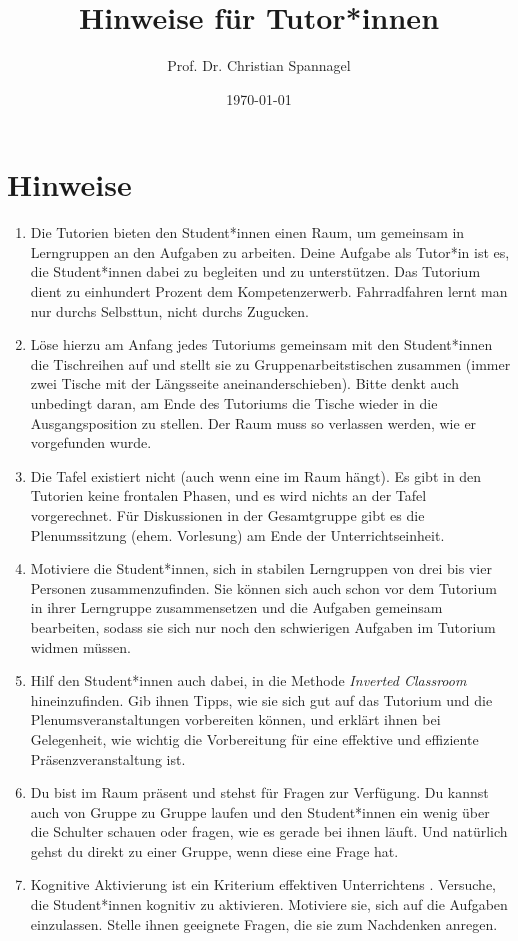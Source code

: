 \documentclass{../cssheet}
\title{Hinweise für Tutor*innen}
\author{Prof. Dr. Christian Spannagel}
\date{\today}
\begin{document}
\printtitle

\section* {Hinweise}
\begin{enumerate}
\item Die Tutorien bieten den Student*innen einen Raum, um gemeinsam in Lerngruppen an den Aufgaben zu arbeiten. Deine Aufgabe als Tutor*in ist es, die Student*innen dabei zu begleiten und zu unterstützen. Das Tutorium dient zu einhundert Prozent dem Kompetenzerwerb. Fahrradfahren lernt man nur durchs Selbsttun, nicht durchs Zugucken.
\item Löse hierzu am Anfang jedes Tutoriums gemeinsam mit den Student*innen die Tischreihen auf und stellt sie zu Gruppenarbeitstischen zusammen (immer zwei Tische mit der Längsseite aneinanderschieben). Bitte denkt auch unbedingt daran, am Ende des Tutoriums die Tische wieder in die Ausgangsposition zu stellen. Der Raum muss so verlassen werden, wie er vorgefunden wurde.
\item Die Tafel existiert nicht (auch wenn eine im Raum hängt). Es gibt in den Tutorien keine frontalen Phasen, und es wird nichts an der Tafel vorgerechnet. Für Diskussionen in der Gesamtgruppe gibt es die Plenumssitzung (ehem. Vorlesung) am Ende der Unterrichtseinheit.
\item Motiviere die Student*innen, sich in stabilen Lerngruppen von drei bis vier Personen zusammenzufinden. Sie können sich auch schon vor dem Tutorium in ihrer Lerngruppe zusammensetzen und die Aufgaben gemeinsam bearbeiten, sodass sie sich nur noch den schwierigen Aufgaben im Tutorium widmen müssen.
\item Hilf den Student*innen auch dabei, in die Methode \emph{Inverted Classroom} hineinzufinden. Gib ihnen Tipps, wie sie sich gut auf das Tutorium und die Plenumsveranstaltungen vorbereiten können, und erklärt ihnen bei Gelegenheit, wie wichtig die Vorbereitung für eine effektive und effiziente Präsenzveranstaltung ist.
\item Du bist im Raum präsent und stehst für Fragen zur Verfügung. Du kannst auch von Gruppe zu Gruppe laufen und den Student*innen ein wenig über die Schulter schauen oder fragen, wie es gerade bei ihnen läuft.  Und natürlich gehst du direkt zu einer Gruppe, wenn diese eine Frage hat.
\item Kognitive Aktivierung ist ein Kriterium effektiven Unterrichtens \parencite{praetorius2018}. Versuche, die Student*innen kognitiv zu aktivieren. Motiviere sie, sich auf die Aufgaben einzulassen. Stelle ihnen geeignete Fragen, die sie zum Nachdenken anregen. 

\end{enumerate}
\end{document}
